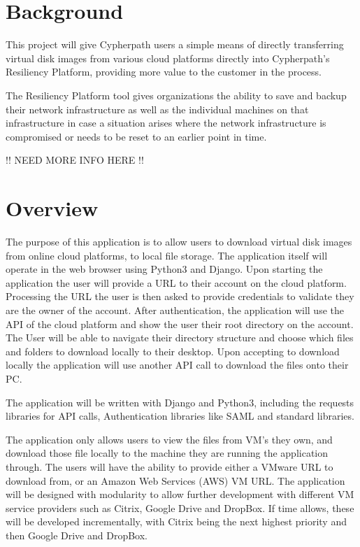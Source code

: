\documentclass{article}
\begin{document}
    \section{Background}
	This project will give Cypherpath users a simple means of directly transferring virtual disk images from various cloud platforms directly into
    Cypherpath's Resiliency Platform, providing more value to the customer in the process.

	The Resiliency Platform tool gives organizations the ability to save and backup their network infrastructure as well as the individual machines on that infrastructure in case a situation
	arises where the network infrastructure is compromised or needs to be reset to an earlier point in time.
	
	\large !! NEED MORE INFO HERE !!
	
    \section{Overview}
    The purpose of this application is to allow users to download virtual disk images from online cloud platforms, to local file storage.
    The application itself will operate in the web browser using Python3 and Django. Upon starting the application the user will
    provide a URL to their account on the cloud platform. Processing the URL the user is then asked to provide credentials to validate they are the owner of
    the account. After authentication, the application will use the API of the cloud platform and show the user their root directory on the account.
    The User will be able to navigate their directory structure and choose which files and folders to download locally to their desktop.
    Upon accepting to download locally the application will use another API call to download the files onto their PC.

    The application will be written with Django and Python3, including the requests libraries for API calls, Authentication libraries like SAML
    and standard libraries.

    The application only allows users to view the files from VM's they own, and download those file locally to the machine they 
    are running the application through. The users will have the ability to provide either a VMware URL to download from, or an
    Amazon Web Services (AWS) VM URL. The application will be designed with modularity to allow further development with different 
	VM service providers such as Citrix, Google Drive and DropBox. If time allows, these will be developed incrementally, with 
	Citrix being the next highest priority and then Google Drive and DropBox.
\end{document}
